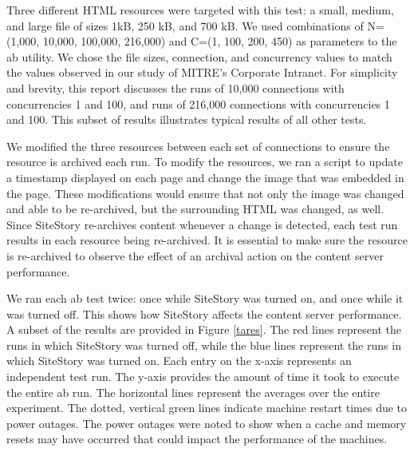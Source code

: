 \documentclass[runningheads,a4paper]{llncs}
\begin{document}
Three different HTML resources were targeted with this test: a small, medium, and large file of sizes 1kB, 250 kB, and 700 kB. 
We used combinations of N=(1,000, 10,000, 100,000, 216,000) and C=(1, 100, 200, 450) as parameters to the ab utility. 
We chose the file sizes, connection, and concurrency values to match the values observed in our study of MITRE's Corporate Intranet. 
For simplicity and brevity, this report discusses the runs of 10,000 connections with concurrencies 1 and 100, and runs of 216,000 connections with concurrencies 1 and 100. 
This subset of results illustrates typical results of all other tests. 

We modified the three resources between each set of connections to ensure the resource is archived each run. To modify the resources, we ran a script to update a timestamp displayed on each page and change the image that was embedded in the page. These modifications would ensure that not only the image was changed and able to be re-archived, but the surrounding HTML was changed, as well. Since SiteStory re-archives content whenever a change is detected, each test run results in each resource being re-archived. It is essential to make sure the resource is re-archived to observe the effect of an archival action on the content server performance.

We ran each ab test twice: once while SiteStory was turned on, and once while it was turned off. This shows how SiteStory affects the content server performance. A subset of the results are provided in Figure \ref{tares}. The red lines represent the runs in which SiteStory was turned off, while the blue lines represent the runs in which SiteStory was turned on. Each entry on the x-axis represents an independent test run. The y-axis provides the amount of time it took to execute the entire ab run. The horizontal lines represent the averages over the entire experiment. The dotted, vertical green lines indicate machine restart times due to power outages. The power outages were noted to show when a cache and memory resets may have occurred that could impact the performance of the machines.
 
\end{document}
